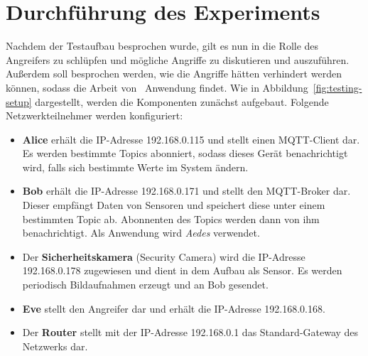 \section{Durchführung des Experiments}
Nachdem der Testaufbau besprochen wurde, gilt es nun in die Rolle des Angreifers
zu schlüpfen und mögliche Angriffe zu diskutieren und auszuführen. Außerdem soll
besprochen werden, wie die Angriffe hätten verhindert werden können, sodass die
Arbeit von~\cite{paper} Anwendung findet. Wie in
Abbildung~\ref{fig:testing-setup} dargestellt, werden die Komponenten zunächst
aufgebaut. Folgende Netzwerkteilnehmer werden konfiguriert:

\begin{itemize}
  \item \textbf{Alice} erhält die IP-Adresse 192.168.0.115 und stellt einen
    MQTT-Client dar. Es werden bestimmte Topics abonniert, sodass dieses Gerät
    benachrichtigt wird, falls sich bestimmte Werte im System ändern.
  \item \textbf{Bob} erhält die IP-Adresse 192.168.0.171 und stellt den
    MQTT-Broker dar. Dieser empfängt Daten von Sensoren und speichert diese
    unter einem bestimmten Topic ab. Abonnenten des Topics werden dann von ihm
    benachrichtigt. Als Anwendung wird \textit{Aedes} verwendet.
  \item Der \textbf{Sicherheitskamera} (Security Camera) wird die IP-Adresse
    192.168.0.178 zugewiesen und dient in dem Aufbau als Sensor. Es werden
    periodisch Bildaufnahmen erzeugt und an Bob gesendet.
  \item \textbf{Eve} stellt den Angreifer dar und erhält die IP-Adresse
    192.168.0.168.
  \item Der \textbf{Router} stellt mit der IP-Adresse 192.168.0.1 das
    Standard-Gateway des Netzwerks dar.
\end{itemize}

